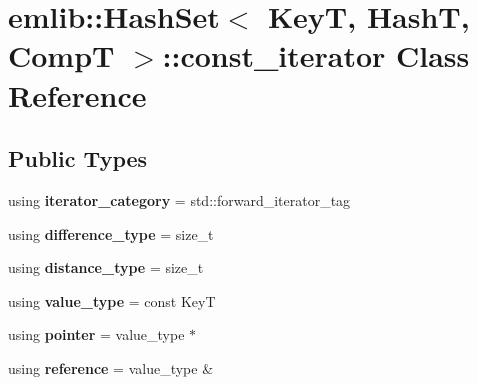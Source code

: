 \hypertarget{classemlib_1_1_hash_set_1_1const__iterator}{\section{emlib\+:\+:Hash\+Set$<$ Key\+T, Hash\+T, Comp\+T $>$\+:\+:const\+\_\+iterator Class Reference}
\label{classemlib_1_1_hash_set_1_1const__iterator}
}
\subsection*{Public Types}
\begin{DoxyCompactItemize}
\item 
\hypertarget{classemlib_1_1_hash_set_1_1const__iterator_a0697f066ced6fe9662d84a7dd332a81c}{using {\bfseries iterator\+\_\+category} = std\+::forward\+\_\+iterator\+\_\+tag}\label{classemlib_1_1_hash_set_1_1const__iterator_a0697f066ced6fe9662d84a7dd332a81c}

\item 
\hypertarget{classemlib_1_1_hash_set_1_1const__iterator_a7834c66423bd4afe74b595ca3092264b}{using {\bfseries difference\+\_\+type} = size\+\_\+t}\label{classemlib_1_1_hash_set_1_1const__iterator_a7834c66423bd4afe74b595ca3092264b}

\item 
\hypertarget{classemlib_1_1_hash_set_1_1const__iterator_ac51f86dbddde2ae0d904a1049817ec31}{using {\bfseries distance\+\_\+type} = size\+\_\+t}\label{classemlib_1_1_hash_set_1_1const__iterator_ac51f86dbddde2ae0d904a1049817ec31}

\item 
\hypertarget{classemlib_1_1_hash_set_1_1const__iterator_af09ac12c4fb8863d5cc36af72406e914}{using {\bfseries value\+\_\+type} = const Key\+T}\label{classemlib_1_1_hash_set_1_1const__iterator_af09ac12c4fb8863d5cc36af72406e914}

\item 
\hypertarget{classemlib_1_1_hash_set_1_1const__iterator_a66ed12578deb21f1f9770b3f68cd1d4c}{using {\bfseries pointer} = value\+\_\+type $\ast$}\label{classemlib_1_1_hash_set_1_1const__iterator_a66ed12578deb21f1f9770b3f68cd1d4c}

\item 
\hypertarget{classemlib_1_1_hash_set_1_1const__iterator_a2e8f78010682725ecb2c66b73d652d03}{using {\bfseries reference} = value\+\_\+type \&}\label{classemlib_1_1_hash_set_1_1const__iterator_a2e8f78010682725ecb2c66b73d652d03}

\end{DoxyCompactItemize}
